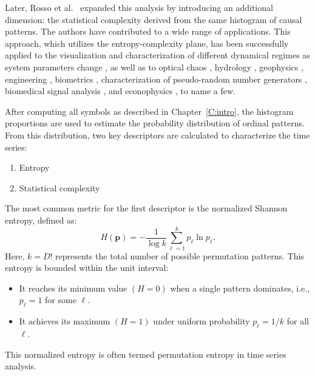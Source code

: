 Later, Rosso et al.~\cite{EEGAnalysisUsingWaveletBasedInformationTools} expanded this analysis by introducing an additional dimension: the statistical complexity derived from the same histogram of causal patterns. The authors have contributed to a wide range of applications. This approach, which utilizes the entropy-complexity plane, has been successfully applied to the visualization and characterization of different dynamical regimes as system parameters change  \cite{Bandt2005,Cao2004,DeMicco2012a,Kowalski2007,Kowalski2011b,Rosso2010a,Zunino2010a,Zunino2012a}, as well as to optical chaos \cite{Liu2016f,Soriano2011a,Toomey2014,Yang2015e,Zunino2011a}, hydrology \cite{Lange2013,Serinaldi2014,Stosic2016}, geophysics \cite{Consolini2014,Saco2010,Sippel2016}, engineering \cite{Aquino2017,Aquino2015,Redelico2017a,Yan2012}, biometrics \cite{Rosso2016}, characterization of pseudo-random number generators \cite{DeMicco2008,DeMicco2009}, biomedical signal analysis \cite{Li2014b,Li2008b,Li2007,Liang2015b,Montani2015a,Montani2014,Montani2014a,Montani2015,Morabito2012,Parlitz2012,Perinelli2025,Perinelli2019,Zanin2012}, and econophysics \cite{Bariviera2015a,Bariviera2015,Bariviera2016,Zanin2012,Zunino2016a,Zunino2009,Zunino2010}, to name a few.

After computing all symbols as described in Chapter~\ref{C:intro}, the histogram proportions are used to estimate the probability distribution of ordinal patterns. 
From this distribution, two key descriptors are calculated to characterize the time series:
\begin{enumerate}
	\item Entropy 
	
	\item Statistical complexity
\end{enumerate}
The most common metric for the first descriptor is the normalized Shannon entropy, defined as:
\begin{equation}
	H(\mathbf{p})=-\dfrac{1}{\log k}\sum^{k}_{\ell=1}p_{\ell} \ln{p_{\ell}}.
\end{equation}
Here, $k=D!$ represents the total number of possible permutation patterns.
This entropy is bounded within the unit interval:
\begin{itemize}
	\item It reaches its minimum value $(H=0)$ when a single pattern dominates, i.e., $p_{\ell}=1$ for some $\ell$.
	\item It achieves its maximum $(H=1)$ under uniform probability $p_{\ell}=1/k$ for all $\ell$. 
\end{itemize}
This normalized entropy is often termed permutation entropy in time series analysis. 

